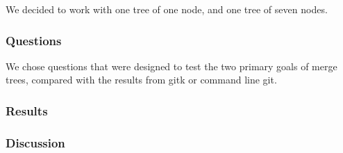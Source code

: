 We decided to work with one tree of one node, and one tree of seven
nodes.

\subsubsection{Questions}
\label{ssub:questions}

We chose questions that were designed to test the two primary goals of
merge trees, compared with the results from gitk or command line git.

\subsubsection{Results}
\label{ssub:results}

\subsubsection{Discussion}
\label{ssub:discussion}

